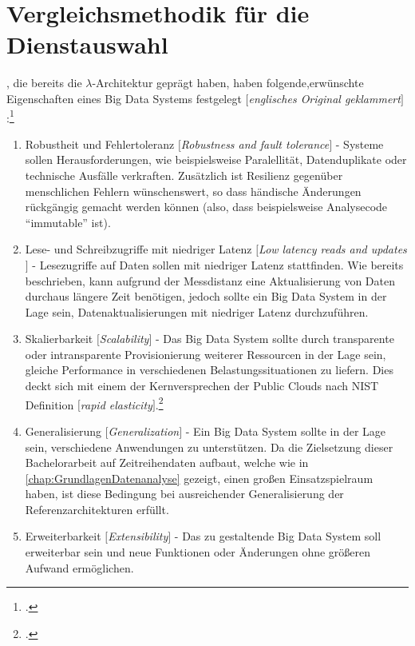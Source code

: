 \section{Vergleichsmethodik für die Dienstauswahl}\label{chap:vergleichsmethodik}

\citeauthor{Marz.2015}, die bereits die $\lambda$-Architektur geprägt haben, haben folgende,erwünschte Eigenschaften eines Big Data Systems festgelegt $\lbrack$\textit{englisches Original geklammert}$\rbrack$:\footcite[Vgl.][7\psqq]{Marz.2015}
\begin{enumerate}
\item Robustheit und Fehlertoleranz $\lbrack$\textit{Robustness and fault tolerance}$\rbrack$ - 
Systeme sollen Herausforderungen, wie beispielsweise Paralellität, Datenduplikate oder technische Ausfälle verkraften. Zusätzlich ist Resilienz gegenüber menschlichen Fehlern wünschenswert, so dass händische Änderungen rückgängig gemacht werden können (also, dass beispielsweise Analysecode \enquote{immutable} ist).

\item Lese- und Schreibzugriffe mit niedriger Latenz $\lbrack$\textit{Low latency reads and updates}$\rbrack$ - 
Lesezugriffe auf Daten sollen mit niedriger Latenz stattfinden. Wie bereits beschrieben, kann aufgrund der Messdistanz eine Aktualisierung von Daten durchaus längere Zeit benötigen, jedoch sollte ein Big Data System in der Lage sein, Datenaktualisierungen mit niedriger Latenz durchzuführen.

\item Skalierbarkeit $\lbrack$\textit{Scalability}$\rbrack$ - 
Das Big Data System sollte durch transparente oder intransparente Provisionierung weiterer Ressourcen in der Lage sein, gleiche Performance in verschiedenen Belastungssituationen zu liefern. Dies deckt sich mit einem der Kernversprechen der Public Clouds nach NIST Definition $\lbrack$\textit{rapid elasticity}$\rbrack$.\footcite[Vgl.][2]{Mell.2011}

\item Generalisierung $\lbrack$\textit{Generalization}$\rbrack$ - 
Ein Big Data System sollte in der Lage sein, verschiedene Anwendungen zu unterstützen. Da die Zielsetzung dieser Bachelorarbeit auf Zeitreihendaten aufbaut, welche wie in \autoref{chap:GrundlagenDatenanalyse} gezeigt, einen großen Einsatzspielraum haben, ist diese Bedingung bei ausreichender Generalisierung der Referenzarchitekturen erfüllt.

\item Erweiterbarkeit $\lbrack$\textit{Extensibility}$\rbrack$ - 
Das zu gestaltende Big Data System soll erweiterbar sein und neue Funktionen oder Änderungen ohne größeren Aufwand ermöglichen.


\end{enumerate}
